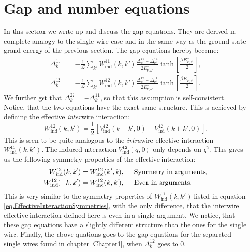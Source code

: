 \section{Gap and number equations}
\label{sec.2wiresgapandnumberequations}
In this section we write up and discuss the gap equations. They are derived in complete analogy to the single wire case and in the same way as the ground state grand energy of the previous section. The gap equations hereby become:
\begin{align}
\Delta^{11}_k &= -\frac{1}{\mathcal{L}}\sum_{k'} W_{\text{ind}}^{11}(k, k')\frac{\Delta^{11}_{k'} + \Delta^{12}_{k'}}{2E^{+}_{F,k'}}\tanh\left[\frac{\beta E^{+}_{F,k'}}{2}\right], \nonumber \\
\Delta^{12}_k &= -\frac{1}{\mathcal{L}}\sum_{k'} W_{\text{ind}}^{12}(k, k')\frac{\Delta^{12}_{k'} + \Delta^{11}_{k'}}{2E^{+}_{F,k'}}\tanh\left[\frac{\beta E^{+}_{F,k'}}{2}\right].
\label{eq.2wiresgapequations}
\end{align}
We further get that $\Delta^{22}_k = - \Delta^{11}_k$, so that this assumption is self-consistent. Notice, that the two equations have the exact same structure. This is achieved by defining the effective \textit{inter}wire interaction: 
\begin{equation}
W_{\text{ind}}^{12}(k, k') = \frac{1}{2}\left[V_{\text{ind}}^{12}(k - k', 0) + V_{\text{ind}}^{12}(k + k', 0) \right].
\end{equation}
This is seen to be quite analogous to the \textit{intra}wire effective interaction $W_{\text{ind}}^{11}(k, k')$. The induced interaction $V_{\text{ind}}^{12}(q, 0)$ only depends on $q^2$. This gives us the following symmetry properties of the effective interaction:
\begin{align}
W_{\text{ind}}^{12}(k,k')   &= W_{\text{ind}}^{12}(k',k), \hspace{0.5cm} \text{Symmetry in arguments}, \nonumber \\
W_{\text{ind}}^{12}(-k,k')  &= W_{\text{ind}}^{12}(k,k'), \hspace{0.5cm} \text{Even in arguments}.
\label{eq.EffectiveInterwireInteractionSymmetries}
\end{align}
This is very similar to the symmetry properties of $W_{\text{ind}}^{11}(k, k')$ listed in equation \ref{eq.EffectiveInteractionSymmetries}, with the only difference, that the interwire effective interaction defined here is even in a single argument. We notice, that these gap equations have a slightly different structure than the ones for the single wire. Finally, the above quations goes to the gap equations for the separated single wires found in chapter \ref{Chapter4}, when $\Delta^{12}_k$ goes to $0$.   	

